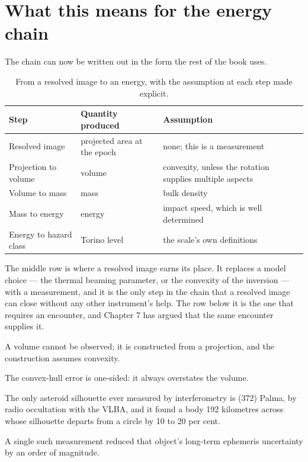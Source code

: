 \section{What this means for the energy chain}

The chain can now be written out in the form the rest of the book uses.

\begin{table}[!htbp]
\centering
\small
\caption{From a resolved image to an energy, with the assumption at each
step made explicit.}
\label{tab:shape-to-energy}
\begin{tabularx}{\textwidth}{@{}P{1.20in}P{1.36in}Y@{}}
\toprule
{}
\textbf{Step} & \textbf{Quantity produced} & \textbf{Assumption} \\
\midrule
Resolved image & projected area at the epoch & none; this is a measurement \\
Projection to volume & volume & convexity, unless the rotation supplies
multiple aspects \\
Volume to mass & mass & bulk density \\
Mass to energy & energy & impact speed, which is well determined \\
Energy to hazard class & Torino level & the scale's own definitions \\
\bottomrule
\end{tabularx}
\end{table}

The middle row is where a resolved image earns its place. It replaces a
model choice --- the thermal beaming parameter, or the convexity of the
inversion --- with a measurement, and it is the only step in the chain that
a resolved image can close without any other instrument's help. The row
below it is the one that requires an encounter, and Chapter 7 has argued
that the same encounter supplies it.

\begin{keytakeaways}
\item A volume cannot be observed; it is constructed from a projection, and
the construction assumes convexity.
\item The convex-hull error is one-sided: it always overstates the volume.
\item The only asteroid silhouette ever measured by interferometry is
(372) Palma, by radio occultation with the VLBA, and it found a body 192
kilometres across whose silhouette departs from a circle by 10 to 20 per
cent.
\item A single such measurement reduced that object's long-term ephemeris
uncertainty by an order of magnitude.
\end{keytakeaways}
